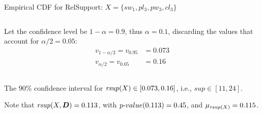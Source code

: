 \def\pshlabel#1{\small {#1}}
\def\psvlabel#1{\small {#1}}
\begin{frame}[fragile]{Empirical CDF for RelSupport: $X = \{sw_1, pl_3, pw_3, cl_3\}$}
\begin{columns}
\hspace*{0.7cm}


\begin{minipage}{0.7\textwidth}
Let the conf\/{i}dence level be $1-\alpha = 0.9$, thus $\alpha = 0.1$,
discarding the values that account for $\alpha/2=0.05$:
  \begin{align*}
    v_{1-\alpha/2} = v_{0.95} & = 0.073\\
      v_{\alpha/2} = v_{0.05} & = 0.16 
  \end{align*}

\end{minipage}

\end{columns}

\vspace*{1cm}

The 90\% conf\/{i}dence interval for $\mathit{rsup}(X) \in [0.073, 0.16]$, i.e.,  $sup \in [11,24]$.
  
\medskip

Note that $\mathit{rsup}(X,{\boldsymbol D})=0.113$, with ${p\text{-}value}(0.113) = 0.45$, 
and $\mu_{\mathit{rsup}(X)} = 0.115$.
\end{frame}
